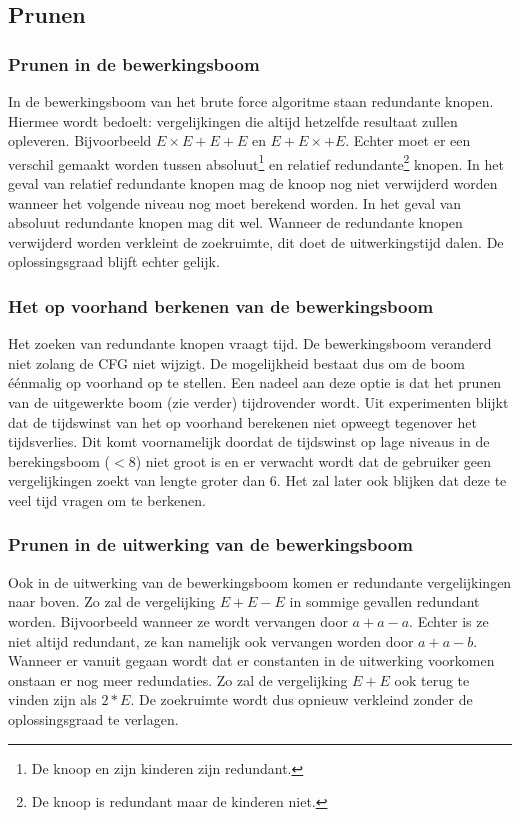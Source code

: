 \documentclass[Main.tex]{subfiles}
\begin{document}
\subsection{Prunen} \label{ss:Prunen}
\subsubsection*{Prunen in de bewerkingsboom}
In de bewerkingsboom van het brute force algoritme staan redundante knopen. Hiermee wordt bedoelt: vergelijkingen die altijd hetzelfde resultaat zullen opleveren. Bijvoorbeeld $E \times E+E+E$ en $E+E \times +E$. Echter moet er een verschil gemaakt worden tussen absoluut\footnote{\label{note:absoluut}De knoop en zijn kinderen zijn redundant.} en relatief redundante\footnote{\label{note:relatief}De knoop is redundant maar de kinderen niet.} knopen.
In het geval van relatief redundante knopen mag de knoop nog niet verwijderd worden wanneer het volgende niveau nog moet berekend worden. In het geval van absoluut redundante knopen mag dit wel. Wanneer de redundante knopen verwijderd worden verkleint de zoekruimte, dit doet de uitwerkingstijd dalen. De oplossingsgraad blijft echter gelijk.
\subsubsection*{Het op voorhand berkenen van de bewerkingsboom}
Het zoeken van redundante knopen vraagt tijd. De bewerkingsboom veranderd niet zolang de CFG niet wijzigt. De mogelijkheid bestaat dus om de boom \'e\'enmalig op voorhand op te stellen. Een nadeel aan deze optie is dat het prunen van de uitgewerkte boom (zie verder) tijdrovender wordt. Uit experimenten blijkt dat de tijdswinst van het op voorhand berekenen niet opweegt tegenover het tijdsverlies. Dit komt voornamelijk doordat de tijdswinst op lage niveaus in de berekingsboom ($< 8$) niet groot is en er verwacht wordt dat de gebruiker geen vergelijkingen zoekt van lengte groter dan 6. Het zal later ook blijken dat deze te veel tijd vragen om te berkenen. 
\subsubsection*{Prunen in de uitwerking van de bewerkingsboom}
Ook in de uitwerking van de bewerkingsboom komen er redundante vergelijkingen naar boven. Zo zal de vergelijking $E+E-E$ in sommige gevallen redundant worden. Bijvoorbeeld wanneer ze wordt vervangen door $a+a-a$. Echter is ze niet altijd redundant, ze kan namelijk ook vervangen worden door $a+a-b$. Wanneer er vanuit gegaan wordt dat er constanten in de uitwerking voorkomen onstaan er nog meer redundaties. Zo zal de vergelijking $E+E$ ook terug te vinden zijn als $2*E$. De zoekruimte wordt dus opnieuw verkleind zonder de oplossingsgraad te verlagen.
\end{document}
